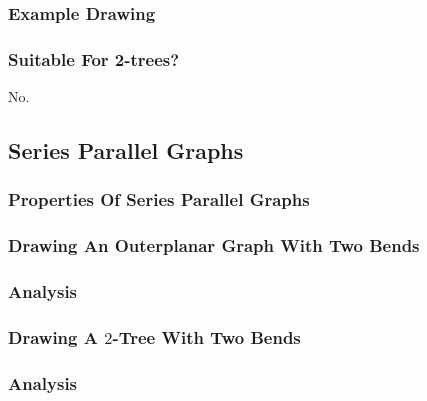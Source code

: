 \subsubsection{Example Drawing}





\subsubsection{Suitable For 2-trees?}
No.

\subsection{Series Parallel Graphs}

\subsubsection{Properties Of Series Parallel Graphs}

\subsubsection{Drawing An Outerplanar Graph With Two Bends}

\subsubsection{Analysis}

\subsubsection{Drawing A $2$-Tree With Two Bends}

\subsubsection{Analysis}


